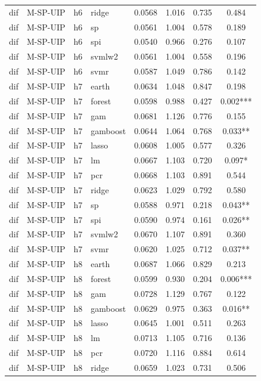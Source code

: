 \begin{ThreePartTable}
\begin{longtable}[t]{llclcccc}
dif & M-SP-UIP & h6 & ridge & 0.0568 & 1.016 & 0.735 & 0.484\\
dif & M-SP-UIP & h6 & sp & 0.0561 & 1.004 & 0.578 & 0.189\\
dif & M-SP-UIP & h6 & spi & 0.0540 & 0.966 & 0.276 & 0.107\\
dif & M-SP-UIP & h6 & svmlw2 & 0.0561 & 1.004 & 0.558 & 0.196\\
dif & M-SP-UIP & h6 & svmr & 0.0587 & 1.049 & 0.786 & 0.142\\
\addlinespace
dif & M-SP-UIP & h7 & earth & 0.0634 & 1.048 & 0.847 & 0.198\\
dif & M-SP-UIP & h7 & forest & 0.0598 & 0.988 & 0.427 & 0.002***\\
dif & M-SP-UIP & h7 & gam & 0.0681 & 1.126 & 0.776 & 0.155\\
dif & M-SP-UIP & h7 & gamboost & 0.0644 & 1.064 & 0.768 & 0.033**\\
dif & M-SP-UIP & h7 & lasso & 0.0608 & 1.005 & 0.577 & 0.326\\
dif & M-SP-UIP & h7 & lm & 0.0667 & 1.103 & 0.720 & 0.097*\\
dif & M-SP-UIP & h7 & pcr & 0.0668 & 1.103 & 0.891 & 0.544\\
dif & M-SP-UIP & h7 & ridge & 0.0623 & 1.029 & 0.792 & 0.580\\
dif & M-SP-UIP & h7 & sp & 0.0588 & 0.971 & 0.218 & 0.043**\\
dif & M-SP-UIP & h7 & spi & 0.0590 & 0.974 & 0.161 & 0.026**\\
dif & M-SP-UIP & h7 & svmlw2 & 0.0670 & 1.107 & 0.891 & 0.360\\
dif & M-SP-UIP & h7 & svmr & 0.0620 & 1.025 & 0.712 & 0.037**\\
\addlinespace
dif & M-SP-UIP & h8 & earth & 0.0687 & 1.066 & 0.829 & 0.213\\
dif & M-SP-UIP & h8 & forest & 0.0599 & 0.930 & 0.204 & 0.006***\\
dif & M-SP-UIP & h8 & gam & 0.0728 & 1.129 & 0.767 & 0.122\\
dif & M-SP-UIP & h8 & gamboost & 0.0629 & 0.975 & 0.363 & 0.016**\\
dif & M-SP-UIP & h8 & lasso & 0.0645 & 1.001 & 0.511 & 0.263\\
dif & M-SP-UIP & h8 & lm & 0.0713 & 1.105 & 0.716 & 0.136\\
dif & M-SP-UIP & h8 & pcr & 0.0720 & 1.116 & 0.884 & 0.614\\
dif & M-SP-UIP & h8 & ridge & 0.0659 & 1.023 & 0.731 & 0.506\\

\end{longtable}
\end{ThreePartTable}
